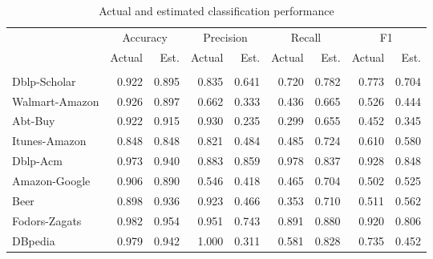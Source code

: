 \begin{table}
\centering
\caption{Actual and estimated classification performance}
\begin{tabular}{lrrrrrrrr}
\toprule
 & \multicolumn{2}{c}{Accuracy} & \multicolumn{2}{c}{Precision} & \multicolumn{2}{c}{Recall} & \multicolumn{2}{c}{F1} \\
 & Actual & Est. & Actual & Est. & Actual & Est. & Actual & Est. \\
 &  &  &  &  &  &  &  &  \\
\midrule
Dblp-Scholar & 0.922 & 0.895 & 0.835 & 0.641 & 0.720 & 0.782 & 0.773 & 0.704 \\
Walmart-Amazon & 0.926 & 0.897 & 0.662 & 0.333 & 0.436 & 0.665 & 0.526 & 0.444 \\
Abt-Buy & 0.922 & 0.915 & 0.930 & 0.235 & 0.299 & 0.655 & 0.452 & 0.345 \\
Itunes-Amazon & 0.848 & 0.848 & 0.821 & 0.484 & 0.485 & 0.724 & 0.610 & 0.580 \\
Dblp-Acm & 0.973 & 0.940 & 0.883 & 0.859 & 0.978 & 0.837 & 0.928 & 0.848 \\
Amazon-Google & 0.906 & 0.890 & 0.546 & 0.418 & 0.465 & 0.704 & 0.502 & 0.525 \\
Beer & 0.898 & 0.936 & 0.923 & 0.466 & 0.353 & 0.710 & 0.511 & 0.562 \\
Fodors-Zagats & 0.982 & 0.954 & 0.951 & 0.743 & 0.891 & 0.880 & 0.920 & 0.806 \\
DBpedia & 0.979 & 0.942 & 1.000 & 0.311 & 0.581 & 0.828 & 0.735 & 0.452 \\
\bottomrule
\end{tabular}
\end{table}
